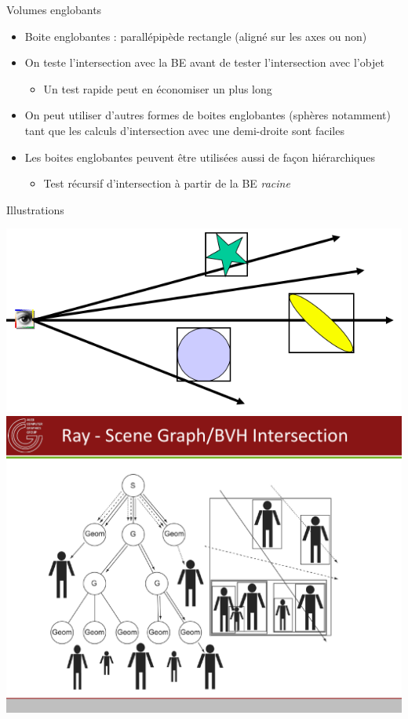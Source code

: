 \begin{frame}{Volumes englobants}
    \begin{itemize}
        \item Boite englobantes : parallépipède rectangle (aligné sur les axes ou non)
        \item On teste l'intersection avec la BE avant de tester l'intersection avec l'objet 
        \begin{itemize}
            \item Un test rapide peut en économiser un plus long
        \end{itemize}
        \item On peut utiliser d'autres formes de boites englobantes (sphères notamment) tant que les calculs d'intersection avec une demi-droite sont faciles 
        \item Les boites englobantes peuvent être utilisées aussi de façon hiérarchiques
        \begin{itemize}
            \item Test récursif d'intersection à partir de la BE \emph{racine}
        \end{itemize}
    \end{itemize}
\end{frame}

\begin{frame}{Illustrations}
    \begin{center}
        \includegraphics[width=.49\textwidth]{figs/bb-1.png}
        \includegraphics[width=.49\textwidth]{figs/bb-2.pdf}
    \end{center}
\end{frame}


